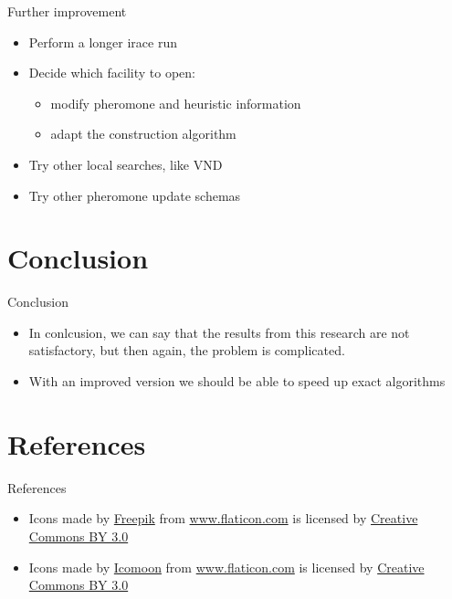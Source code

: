 \documentclass{beamer}
\begin{document}
\begin{frame}{Further improvement}
\begin{itemize}
\item
Perform a longer irace run
\item
Decide which facility to open:
\begin{itemize}
\item
modify pheromone and heuristic information
\item
adapt the construction algorithm
\end{itemize}
\item
Try other local searches, like VND
\item
Try other pheromone update schemas

\end{itemize}
\end{frame}

\section*{Conclusion}

\begin{frame}{Conclusion}
\begin{itemize}
\item
In conlcusion, we can say that the results from this research are not satisfactory, but then again, the problem is complicated.
\item
With an improved version we should be able to speed up exact algorithms
\end{itemize}
\end{frame}

\section{References}

\begin{frame}{References}

\begin{itemize}

    \item Icons made by \href{http://www.freepik.com}{Freepik} from \href{http://www.flaticon.com}{www.flaticon.com} is licensed by \href{http://creativecommons.org/licenses/by/3.0/}{Creative Commons BY 3.0}

    \item Icons made by \href{http://www.flaticon.com/authors/icomoon}{Icomoon} from \href{http://www.flaticon.com}{www.flaticon.com} is licensed by \href{http://creativecommons.org/licenses/by/3.0/}{Creative Commons BY 3.0}

\end{itemize}

\end{frame}
\end{document}
